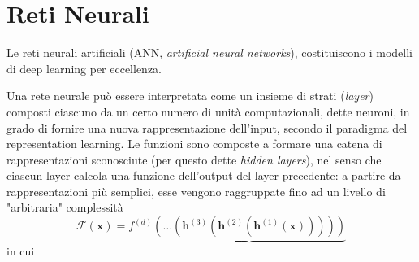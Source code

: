 \section{Reti Neurali}
\label{ANN}

Le reti neurali artificiali (ANN, \textit{artificial neural networks}), costituiscono i modelli di deep learning per eccellenza.

Una rete neurale può essere interpretata come un insieme di strati (\textit{layer}) composti
ciascuno da un certo numero di unità computazionali, dette neuroni, in grado di fornire una nuova rappresentazione dell'input, secondo il paradigma del representation learning. Le funzioni sono composte a formare una catena di rappresentazioni sconosciute (per questo dette \textit{hidden layers}), nel senso che ciascun layer calcola una funzione dell'output del layer precedente: a partire da rappresentazioni più semplici, esse vengono raggruppate fino ad un livello di "arbitraria" complessità
\begin{equation*}
\mathcal{F}(\mathbf{x})=f^{(d)}\underbrace{(\dots(\mathbf{h}^{(3)}(\mathbf{h}^{(2)}(\mathbf{h}^{(1)}(\mathbf{x})))))}
\end{equation*}
in cui
